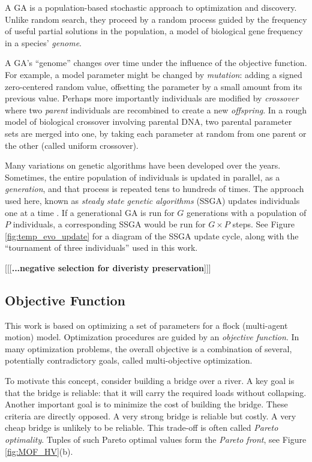 \documentclass[letterpaper]{article}
\begin{document}
A GA is a population-based stochastic approach to optimization and discovery. Unlike random search, they proceed by a random process guided by the frequency of useful partial solutions in the population, a model of biological gene frequency in a species' \textit{genome}.

A GA's ``genome'' changes over time under the influence of the objective function. For example, a model parameter might be changed by \textit{mutation}: adding a signed zero-centered random value, offsetting the parameter by a small amount from its previous value. Perhaps more importantly individuals are modified by \textit{crossover} where two \textit{parent} individuals are recombined to create a new \textit{offspring}. In a rough model of biological crossover involving parental DNA, two parental parameter sets are merged into one, by taking each parameter at random from one parent or the other (called uniform crossover).

Many variations on genetic algorithms have been developed over the years. Sometimes, the entire population of individuals is updated in parallel, as a \textit{generation}, and that process is repeated tens to hundreds of times. The approach used here, known as \textit{steady state genetic algorithms} (SSGA) updates individuals one at a time \citep{syswerda_study_1991}. If a generational GA is run for $G$ generations with a population of $P$ individuals, a corresponding SSGA would be run for $G{\times}P$ steps. See Figure \ref{fig:temp_evo_update} for a diagram of the SSGA update cycle, along with the ``tournament of three individuals'' used in this work.

[[[\textbf{...negative selection for diveristy preservation}]]]

\subsection{Objective Function}
\label{subsec:ObjectiveFunction}

This work is based on optimizing a set of parameters for a flock (multi-agent motion) model. Optimization procedures are guided by an \textit{objective function}. In many optimization problems, the overall objective is a combination of several, potentially contradictory goals, called multi-objective optimization. 

To motivate this concept, consider building a bridge over a river. A key goal is that the bridge is reliable: that it will carry the required loads without collapsing. Another important goal is to minimize the cost of building the bridge. These criteria are directly opposed. A very strong bridge is reliable but costly. A very cheap bridge is unlikely to be reliable. This trade-off is often called \textit{Pareto optimality}. Tuples of such Pareto optimal values form the \textit{Pareto front}, see Figure \ref{fig:MOF_HV}(b).
\end{document}
